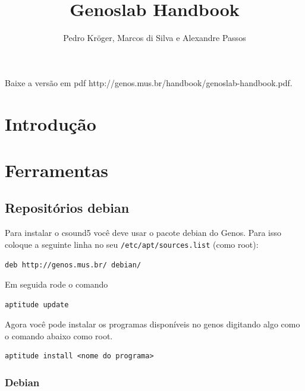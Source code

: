 \documentclass[12pt,brazil]{book}
\title{Genoslab Handbook}
\author{Pedro Kröger, Marcos di Silva e Alexandre Passos}
\begin{document}
\graphicspath{{figs/}}

\maketitle

\begin{htmlonly}
  Baixe a versão em pdf 
  {http://genos.mus.br/handbook/genoslab-handbook.pdf}.
\end{htmlonly}

\tableofcontents

\part{Introdução}
\label{part:introducao}


\part{Ferramentas}
\label{part:ferramentas}

\chapter{Repositórios debian}
\label{cha:repositorios-debian}

Para instalar o csound5 você deve usar o pacote debian do Genos. Para
isso coloque a seguinte linha no seu \texttt{/etc/apt/sources.list}
(como root):

\begin{verbatim}
deb http://genos.mus.br/ debian/
\end{verbatim}

Em seguida rode o comando

\begin{verbatim}
aptitude update
\end{verbatim}

Agora você pode instalar os programas disponíveis no genos digitando
algo como o comando abaixo como root.

\begin{verbatim}
aptitude install <nome do programa>
\end{verbatim}

\section{Debian}
\label{sec:debian}
\end{document}
